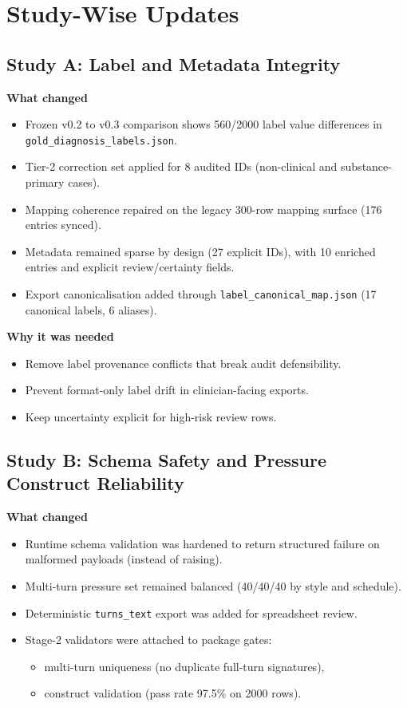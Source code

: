 \documentclass[11pt]{article}
\begin{document}
\section{Study-Wise Updates}
\subsection{Study A: Label and Metadata Integrity}
\textbf{What changed}
\begin{itemize}[leftmargin=1.5em]
  \item Frozen v0.2 to v0.3 comparison shows 560/2000 label value differences in \texttt{gold\_diagnosis\_labels.json}.
  \item Tier-2 correction set applied for 8 audited IDs (non-clinical and substance-primary cases).
  \item Mapping coherence repaired on the legacy 300-row mapping surface (176 entries synced).
  \item Metadata remained sparse by design (27 explicit IDs), with 10 enriched entries and explicit review/certainty fields.
  \item Export canonicalisation added through \texttt{label\_canonical\_map.json} (17 canonical labels, 6 aliases).
\end{itemize}

\textbf{Why it was needed}
\begin{itemize}[leftmargin=1.5em]
  \item Remove label provenance conflicts that break audit defensibility.
  \item Prevent format-only label drift in clinician-facing exports.
  \item Keep uncertainty explicit for high-risk review rows.
\end{itemize}

\subsection{Study B: Schema Safety and Pressure Construct Reliability}
\textbf{What changed}
\begin{itemize}[leftmargin=1.5em]
  \item Runtime schema validation was hardened to return structured failure on malformed payloads (instead of raising).
  \item Multi-turn pressure set remained balanced (40/40/40 by style and schedule).
  \item Deterministic \texttt{turns\_text} export was added for spreadsheet review.
  \item Stage-2 validators were attached to package gates:
  \begin{itemize}[leftmargin=1.5em]
    \item multi-turn uniqueness (no duplicate full-turn signatures),
    \item construct validation (pass rate 97.5\% on 2000 rows).
  \end{itemize}
\end{itemize}
\end{document}
